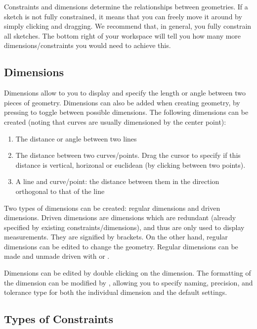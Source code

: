 \cbstart
{}
Constraints and dimensions determine the relationships between geometries. If a sketch is not fully constrained, it means that you can freely move it around by simply clicking and dragging. We recommend that, in general, you fully constrain all sketches. The bottom right of your workspace will tell you how many more dimensions/constraints you would need to achieve this.

\cbend

\subsection{Dimensions}
\cbstart
Dimensions allow to you to display and specify the length or angle between two pieces of geometry. Dimensions can also be added when creating geometry, by pressing  to toggle between possible dimensions. The following dimensions can be created (noting that curves are usually dimensioned by the center point):

\begin{enumerate}
\item The distance or angle between two lines
\item The distance between two curves/points. Drag the cursor to specify if this distance is vertical, horizonal or euclidean (by clicking between two points).
\item A line and curve/point: the distance between them in the direction orthogonal to that of the line
\end{enumerate}

Two types of dimensions can be created: regular dimensions and driven dimensions. Driven dimensions are dimensions which are redundant (already specified by existing constraints/dimensions), and thus are only used to display measurements. They are signified by brackets. On the other hand, regular dimensions can be edited to change the geometry. Regular dimensions can be made and unmade driven with  or .

Dimensions can be edited by double clicking on the dimension. The formatting of the dimension can be modified by , allowing you to specify naming, precision, and tolerance type for both the individual dimension and the default settings.

\cbend

\subsection{Types of Constraints}

